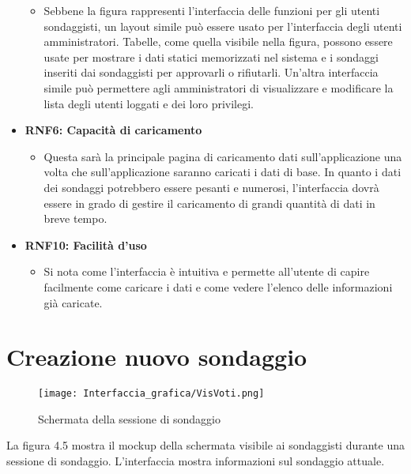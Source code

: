 \begin{itemize}
\begin{itemize}
            \item Sebbene la figura rappresenti l'interfaccia delle funzioni per gli utenti sondaggisti, un layout simile può essere usato per l'interfaccia degli utenti amministratori. Tabelle, come quella visibile nella figura, possono essere usate per mostrare i dati statici memorizzati nel sistema e i sondaggi inseriti dai sondaggisti per approvarli o rifiutarli. Un'altra interfaccia simile può permettere agli amministratori di visualizzare e modificare la lista degli utenti loggati e dei loro privilegi.
        \end{itemize} 
        \item \textbf{RNF6: Capacità di caricamento} \begin{itemize}
            \item Questa sarà la principale pagina di caricamento dati sull'applicazione una volta che sull'applicazione saranno caricati i dati di base. In quanto i dati dei sondaggi potrebbero essere pesanti e numerosi, l'interfaccia dovrà essere in grado di gestire il caricamento di grandi quantità di dati in breve tempo.
        \end{itemize}
        \item \textbf{RNF10: Facilità d'uso} \begin{itemize}
            \item Si nota come l'interfaccia è intuitiva e permette all'utente di capire facilmente come caricare i dati e come vedere l'elenco delle informazioni già caricate.
        \end{itemize}
    \end{itemize}

\section{Creazione nuovo sondaggio}

    \begin{figure}[H]
        \center
        \texttt{[image: Interfaccia\_grafica/VisVoti.png]}
        \caption{Schermata della sessione di sondaggio}
    \end{figure}

    La figura 4.5 mostra il mockup della schermata visibile ai sondaggisti durante una sessione di sondaggio. L'interfaccia mostra informazioni sul sondaggio attuale.

